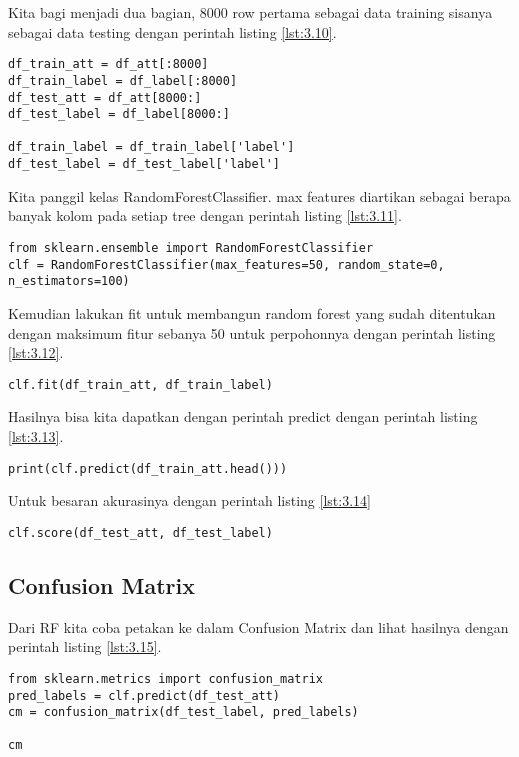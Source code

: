 Kita bagi menjadi dua bagian, 8000 row pertama sebagai data training sisanya sebagai data testing dengan perintah listing \ref{lst:3.10}.
\begin{lstlisting}[caption=Pembagian data training dan test,label={lst:3.10}]
df_train_att = df_att[:8000]
df_train_label = df_label[:8000]
df_test_att = df_att[8000:]
df_test_label = df_label[8000:]

df_train_label = df_train_label['label']
df_test_label = df_test_label['label']
\end{lstlisting}

Kita panggil kelas RandomForestClassifier. max features diartikan sebagai berapa banyak kolom pada setiap tree dengan perintah listing \ref{lst:3.11}.
\begin{lstlisting}[caption=Instansiasi kelas Random Forest,label={lst:3.11}]
from sklearn.ensemble import RandomForestClassifier
clf = RandomForestClassifier(max_features=50, random_state=0, n_estimators=100)

\end{lstlisting}
Kemudian lakukan fit untuk membangun random forest yang sudah ditentukan dengan maksimum fitur sebanya 50 untuk perpohonnya dengan perintah listing \ref{lst:3.12}.

\begin{lstlisting}[caption=Fitting random forest dengan dataset training,label={lst:3.12}]
clf.fit(df_train_att, df_train_label)
\end{lstlisting}
Hasilnya bisa kita dapatkan dengan perintah predict dengan perintah listing \ref{lst:3.13}.
\begin{lstlisting}[caption=Melihat Hasil prediksi,label={lst:3.13}]
print(clf.predict(df_train_att.head()))
\end{lstlisting}

Untuk besaran akurasinya dengan perintah listing \ref{lst:3.14}
\begin{lstlisting}[caption=Score perolehan dari klasifikasi,label={lst:3.14}]
clf.score(df_test_att, df_test_label)
\end{lstlisting}

\subsection{Confusion Matrix}
Dari RF kita coba petakan ke dalam Confusion Matrix dan lihat hasilnya dengan perintah listing \ref{lst:3.15}.
\begin{lstlisting}[caption=Membuat Confusion Matrix,label={lst:3.15}]
from sklearn.metrics import confusion_matrix
pred_labels = clf.predict(df_test_att)
cm = confusion_matrix(df_test_label, pred_labels)

cm
\end{lstlisting}

